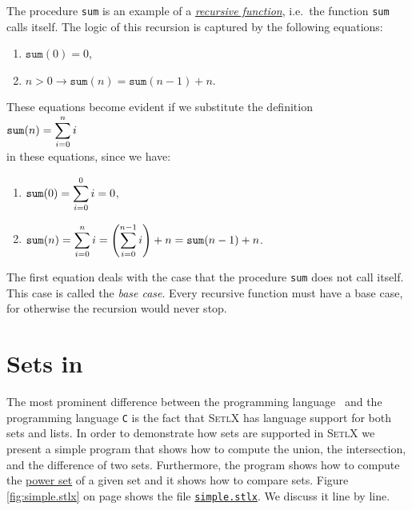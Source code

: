 The procedure \texttt{sum} is an example of a
\href{https://en.wikipedia.org/wiki/Recursion_(computer_science)}{\emph{recursive function}},
i.e.~the function \texttt{sum} calls itself.  The logic of this recursion is captured by the
following equations:
\begin{enumerate}
\item $\texttt{sum}(0) = 0$,
\item $n > 0 \rightarrow \texttt{sum}(n) = \texttt{sum}(n-1) + n$.
\end{enumerate}
These equations become evident if we substitute the definition
\\[0.2cm]
\hspace*{1.3cm}
$\displaystyle \texttt{sum}(n)= \sum\limits_{i=0}^n i$ 
\\[0.2cm]
in these equations, since we have:
\begin{enumerate}
\item $\displaystyle \texttt{sum}(0)= \sum\limits_{i=0}^0 i = 0$,
\item $\displaystyle \texttt{sum}(n)= \sum\limits_{i=0}^n i = \left(\sum\limits_{i=0}^{n-1} i\right) + n = \texttt{sum}(n-1) + n$. 

\end{enumerate}
The first equation deals with the case that the procedure \texttt{sum} does not call itself.  This
case is called the \emph{base case}.  Every recursive function must have a base case, for otherwise
the recursion would never stop.


\section{Sets in \setl}
The most prominent difference between the programming language \setl\ and the programming language
\texttt{C} is the fact that  \textsc{SetlX} has language support for both sets and lists.
In order to demonstrate how sets are supported in \textsc{SetlX} we present a simple program that
shows how to compute the union, the intersection, and the difference of two sets.  Furthermore, the
program shows how to compute the \href{https://en.wikipedia.org/wiki/Power_set}{power set} of a
given set and it shows how to compare sets.  Figure \ref{fig:simple.stlx} on page
\pageref{fig:simple.stlx} shows the file
\href{https://github.com/karlstroetmann/Logik/blob/master/SetlX/simple.stlx}{\texttt{simple.stlx}}.  
We discuss it line by line.

